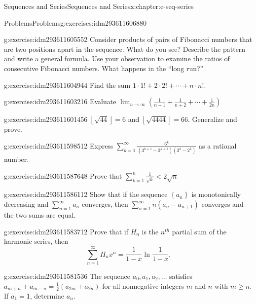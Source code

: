 \documentclass[twoside,10pt,]{book}
\numberwithin{equation}{section}
\newcommand{\lt}{<}
\begin{document}
\begin{chapterptx}{Sequences and Series}{}{Sequences and Series}{}{}{x:chapter:c-seq-series}
\begin{exercises-section}{Problems}{}{Problems}{}{}{g:exercises:idm293611606880}
\begin{divisionexercise}{1}{}{}{g:exercise:idm293611605552}
Consider products of pairs of Fibonacci numbers that are two positions apart in the sequence.  What do you see?  Describe the pattern and write a general formula.  Use your observation to examine the ratios of consecutive Fibonacci numbers.   What happens in the  ``long run?''%
\end{divisionexercise}%
\begin{divisionexercise}{2}{}{}{g:exercise:idm293611604944}%
Find the sum  \(1\cdot 1! + 2\cdot 2! + \cdots +n\cdot n!\).%
\end{divisionexercise}%
\begin{divisionexercise}{3}{}{}{g:exercise:idm293611603216}%
Evaluate  \(\lim_{n\to \infty }  \left(\frac{1}{n+1}+ \frac{1}{n+2}+ \cdots +\frac{1}{2n}\right)\)%
\end{divisionexercise}%
\begin{divisionexercise}{4}{}{}{g:exercise:idm293611601456}%
\(\left\lfloor \sqrt{44}\right\rfloor =6\) and   \(\left\lfloor \sqrt{4444}\right\rfloor =66\).  Generalize and prove.%
\end{divisionexercise}%
\begin{divisionexercise}{5}{}{}{g:exercise:idm293611598512}%
Express \(\sum _{k=1}^{\infty } \frac{6^k}{\left(3^{k+1}-2^{k+1}\right) \left(3^k-2^k\right)}\) as a rational number.%
\end{divisionexercise}%
\begin{divisionexercise}{6}{}{}{g:exercise:idm293611587648}%
Prove that \(\sum _{k=1}^n \frac{1}{\sqrt{k}}\lt 2\sqrt{n}\)%
\end{divisionexercise}%
\begin{divisionexercise}{7}{}{}{g:exercise:idm293611586112}%
Show that if the sequence \(\left\{a_n\right\}\) is monotonically decreasing and \(\sum _{n=1}^{\infty } a_n\) converges, then \(\sum _{n=1}^{\infty} n \left(a_n-a_{n+1}\right)\) converges and the two sums are equal.%
\end{divisionexercise}%
\begin{divisionexercise}{8}{}{}{g:exercise:idm293611583712}%
Prove that if \(H_n\) is the \(n^{th}\) partial sum of the harmonic series, then%
\begin{equation*}
\sum_{n=1}^{\infty} H_{n} x^n = \frac{1}{1-x} \ln{\frac{1}{1-x}}\text{.}
\end{equation*}
%
\end{divisionexercise}%
\begin{divisionexercise}{9}{}{}{g:exercise:idm293611581536}%
The sequence \(a_0, a_1, a_2,\ldots\) satisfies \(a_{m+n}+a_{m-n}=\frac{1}{2}\left(a_{2m}+a_{2n}\right)\) for all nonnegative integers \(m\) and \(n\) with \(m\geq n\).  If \(a_1= 1\), determine \(a_n\).%

\end{divisionexercise}
\end{exercises-section}
\end{chapterptx}
\end{document}
